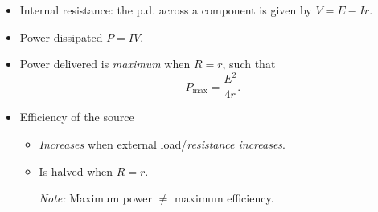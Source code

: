 \documentclass[oneside]{book}
\begin{document}
\begin{itemize}
    \item Internal resistance: the p.d. across a component is given by \(V=E-Ir\).
    \item Power dissipated \(P=IV\).
    \item Power delivered is \emph{maximum } when \(R=r\), such that 
    \[P_{\text{max}}=\frac{E^2}{4r}.\]
    \item Efficiency of the source
    \begin{itemize}
        \item \emph{Increases} when external load/\emph{resistance increases}.
        \item Is halved when \(R=r\).

        \emph{Note:} Maximum power \(\neq\) maximum efficiency.
    \end{itemize}
\end{itemize}
\end{document}
